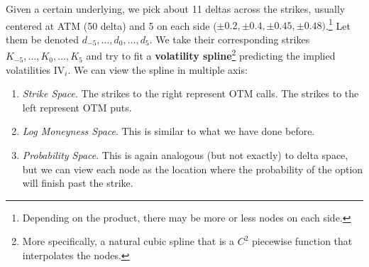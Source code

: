 \documentclass{article}
\begin{document}
    \begin{definition}
      Given a certain underlying, we pick about 11 deltas across the strikes, usually centered at ATM (50 delta) and 5 on each side ($\pm 0.2, \pm 0.4, \pm 0.45, \pm 0.48)$.\footnote{Depending on the product, there may be more or less nodes on each side.} Let them be denoted $d_{-5}, \ldots, d_0, \ldots, d_5$. We take their corresponding strikes $K_{-5}, \ldots, K_0, \ldots, K_5$ and try to fit a \textbf{volatility spline}\footnote{More specifically, a natural cubic spline that is a $C^2$ piecewise function that interpolates the nodes.} predicting the implied volatilities $\mathrm{IV}_{i}$. We can view the spline in multiple axis: 
      \begin{enumerate}
        \item \textit{Strike Space}. The strikes to the right represent OTM calls. The strikes to the left represent OTM puts. 
        \item \textit{Log Moneyness Space}. This is similar to what we have done before. 
        \item \textit{Probability Space}. This is again analogous (but not exactly) to delta space, but we can view each node as the location where the probability of the option will finish past the strike.  
      \end{enumerate}
      

\end{definition}
\end{document}
